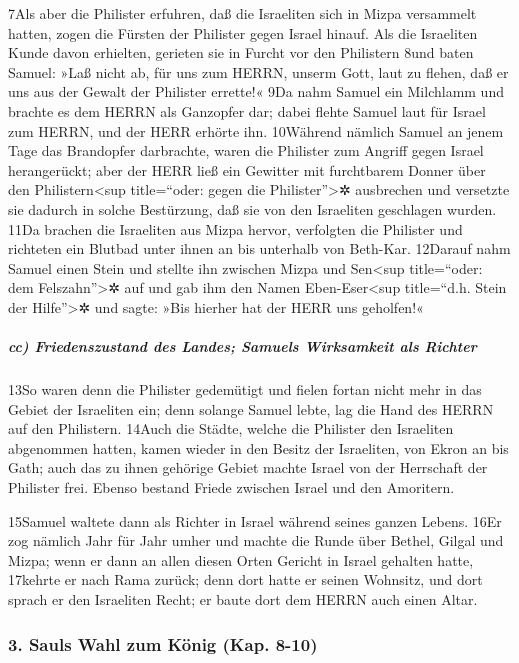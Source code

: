 7Als aber die Philister erfuhren, daß die Israeliten sich in Mizpa
versammelt hatten, zogen die Fürsten der Philister gegen Israel hinauf.
Als die Israeliten Kunde davon erhielten, gerieten sie in Furcht vor den
Philistern 8und baten Samuel: »Laß nicht ab, für uns zum HERRN, unserm
Gott, laut zu flehen, daß er uns aus der Gewalt der Philister errette!«
9Da nahm Samuel ein Milchlamm und brachte es dem HERRN als Ganzopfer
dar; dabei flehte Samuel laut für Israel zum HERRN, und der HERR erhörte
ihn. 10Während nämlich Samuel an jenem Tage das Brandopfer darbrachte,
waren die Philister zum Angriff gegen Israel herangerückt; aber der HERR
ließ ein Gewitter mit furchtbarem Donner über den
Philistern\textless sup title=``oder: gegen die Philister''\textgreater✲
ausbrechen und versetzte sie dadurch in solche Bestürzung, daß sie von
den Israeliten geschlagen wurden. 11Da brachen die Israeliten aus Mizpa
hervor, verfolgten die Philister und richteten ein Blutbad unter ihnen
an bis unterhalb von Beth-Kar. 12Darauf nahm Samuel einen Stein und
stellte ihn zwischen Mizpa und Sen\textless sup title=``oder: dem
Felszahn''\textgreater✲ auf und gab ihm den Namen Eben-Eser\textless sup
title=``d.h. Stein der Hilfe''\textgreater✲ und sagte: »Bis hierher hat
der HERR uns geholfen!«

\hypertarget{cc-friedenszustand-des-landes-samuels-wirksamkeit-als-richter}{%
\subparagraph{cc) Friedenszustand des Landes; Samuels Wirksamkeit als
Richter}\label{cc-friedenszustand-des-landes-samuels-wirksamkeit-als-richter}}

13So waren denn die Philister gedemütigt und fielen fortan nicht mehr in
das Gebiet der Israeliten ein; denn solange Samuel lebte, lag die Hand
des HERRN auf den Philistern. 14Auch die Städte, welche die Philister
den Israeliten abgenommen hatten, kamen wieder in den Besitz der
Israeliten, von Ekron an bis Gath; auch das zu ihnen gehörige Gebiet
machte Israel von der Herrschaft der Philister frei. Ebenso bestand
Friede zwischen Israel und den Amoritern.

15Samuel waltete dann als Richter in Israel während seines ganzen
Lebens. 16Er zog nämlich Jahr für Jahr umher und machte die Runde über
Bethel, Gilgal und Mizpa; wenn er dann an allen diesen Orten Gericht in
Israel gehalten hatte, 17kehrte er nach Rama zurück; denn dort hatte er
seinen Wohnsitz, und dort sprach er den Israeliten Recht; er baute dort
dem HERRN auch einen Altar.

\hypertarget{sauls-wahl-zum-kuxf6nig-kap.-8-10}{%
\subsubsection{3. Sauls Wahl zum König (Kap.
8-10)}\label{sauls-wahl-zum-kuxf6nig-kap.-8-10}}

